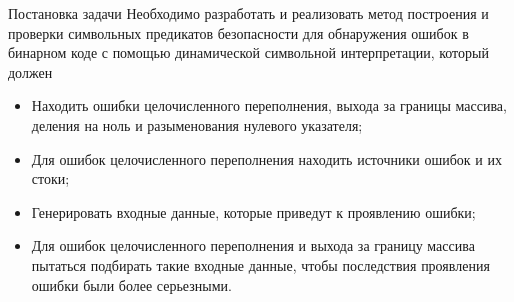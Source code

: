 \documentclass[10pt]{beamer}
\begin{document}
%

\begin{frame}{Постановка задачи}
Необходимо разработать и реализовать метод построения и проверки символьных
предикатов безопасности для обнаружения ошибок в бинарном коде с помощью динамической
символьной интерпретации, который должен
\begin{itemize}
    \item Находить ошибки целочисленного переполнения, выхода за границы
        массива, деления на ноль и разыменования нулевого указателя;
    \item Для ошибок целочисленного переполнения находить источники ошибок и их
        стоки;
    \item Генерировать входные данные, которые приведут к проявлению ошибки;
    \item Для ошибок целочисленного переполнения и выхода за границу массива
        пытаться подбирать такие входные данные, чтобы последствия проявления
        ошибки были более серьезными.
\end{itemize}
\end{frame}
\end{document}
